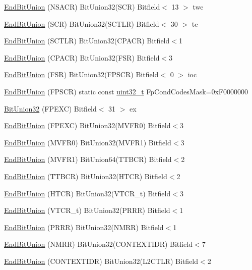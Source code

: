 \begin{DoxyCompactItemize}
\item 
\hyperlink{namespaceArmISA_a3d3f62a8ec68a8c5bccb723ddf390033}{EndBitUnion} (NSACR) BitUnion32(SCR) Bitfield$<$ 13 $>$ twe
\item 
\hyperlink{namespaceArmISA_a5dde7a10c5652538a443b2ec2195996d}{EndBitUnion} (SCR) BitUnion32(SCTLR) Bitfield$<$ 30 $>$ te
\item 
\hyperlink{namespaceArmISA_ae7c049db984dcd08a79bc7d606be543d}{EndBitUnion} (SCTLR) BitUnion32(CPACR) Bitfield$<$1
\item 
\hyperlink{namespaceArmISA_a376c6f292d310fc6d7f2f375e5d4c779}{EndBitUnion} (CPACR) BitUnion32(FSR) Bitfield$<$3
\item 
\hyperlink{namespaceArmISA_a98c7c8e647ac73572d2d7356a134eda7}{EndBitUnion} (FSR) BitUnion32(FPSCR) Bitfield$<$ 0 $>$ ioc
\item 
\hyperlink{namespaceArmISA_a68a2c0b11bafc7e76b9407c09fdb4564}{EndBitUnion} (FPSCR) static const \hyperlink{Type_8hh_a435d1572bf3f880d55459d9805097f62}{uint32\_\-t} FpCondCodesMask=0xF0000000
\item 
\hyperlink{namespaceArmISA_a36c3fdf294c433d6787237236370c946}{BitUnion32} (FPEXC) Bitfield$<$ 31 $>$ ex
\item 
\hyperlink{namespaceArmISA_a465d31436d8ae77cfa4dfa5f36be8658}{EndBitUnion} (FPEXC) BitUnion32(MVFR0) Bitfield$<$3
\item 
\hyperlink{namespaceArmISA_a0a27564bcd95fcac0bbc3d9e117a1bad}{EndBitUnion} (MVFR0) BitUnion32(MVFR1) Bitfield$<$3
\item 
\hyperlink{namespaceArmISA_a9012e5eacb952480b12545631eff3210}{EndBitUnion} (MVFR1) BitUnion64(TTBCR) Bitfield$<$2
\item 
\hyperlink{namespaceArmISA_a5deec2daeddfb9d0c9dd5d31965f890a}{EndBitUnion} (TTBCR) BitUnion32(HTCR) Bitfield$<$2
\item 
\hyperlink{namespaceArmISA_ae7e5181ed52badae308aec1d61654b69}{EndBitUnion} (HTCR) BitUnion32(VTCR\_\-t) Bitfield$<$3
\item 
\hyperlink{namespaceArmISA_a47e12d424b562f8a1052a006df692308}{EndBitUnion} (VTCR\_\-t) BitUnion32(PRRR) Bitfield$<$1
\item 
\hyperlink{namespaceArmISA_a20bc68fb524ee4dd8c8c81335a79dc1f}{EndBitUnion} (PRRR) BitUnion32(NMRR) Bitfield$<$1
\item 
\hyperlink{namespaceArmISA_a4a682fe9946455390291a57d880494b8}{EndBitUnion} (NMRR) BitUnion32(CONTEXTIDR) Bitfield$<$7
\item 
\hyperlink{namespaceArmISA_a17dea589f7193542435c779f086c3aeb}{EndBitUnion} (CONTEXTIDR) BitUnion32(L2CTLR) Bitfield$<$2

\end{DoxyCompactItemize}
